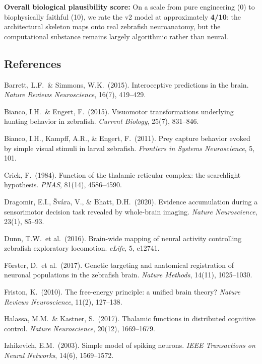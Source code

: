\documentclass[11pt,a4paper]{article}
\begin{document}
\bigskip
\noindent\textbf{Overall biological plausibility score:}
On a scale from pure engineering (0) to biophysically faithful (10),
we rate the v2 model at approximately \textbf{4/10}: the architectural
skeleton maps onto real zebrafish neuroanatomy, but the computational
substance remains largely algorithmic rather than neural.

\subsection*{References}

\begin{small}
\noindent
Barrett, L.F.\ \& Simmons, W.K.\ (2015). Interoceptive predictions in the brain.
\textit{Nature Reviews Neuroscience}, 16(7), 419--429.

\noindent
Bianco, I.H.\ \& Engert, F.\ (2015). Visuomotor transformations underlying hunting behavior in zebrafish.
\textit{Current Biology}, 25(7), 831--846.

\noindent
Bianco, I.H., Kampff, A.R., \& Engert, F.\ (2011). Prey capture behavior evoked by simple visual stimuli in larval zebrafish.
\textit{Frontiers in Systems Neuroscience}, 5, 101.

\noindent
Crick, F.\ (1984). Function of the thalamic reticular complex: the searchlight hypothesis.
\textit{PNAS}, 81(14), 4586--4590.

\noindent
Dragomir, E.I., \v{S}v\'ara, V., \& Bhatt, D.H.\ (2020). Evidence accumulation during a sensorimotor decision task revealed by whole-brain imaging.
\textit{Nature Neuroscience}, 23(1), 85--93.

\noindent
Dunn, T.W.\ et al.\ (2016). Brain-wide mapping of neural activity controlling zebrafish exploratory locomotion.
\textit{eLife}, 5, e12741.

\noindent
F\"orster, D.\ et al.\ (2017). Genetic targeting and anatomical registration of neuronal populations in the zebrafish brain.
\textit{Nature Methods}, 14(11), 1025--1030.

\noindent
Friston, K.\ (2010). The free-energy principle: a unified brain theory?
\textit{Nature Reviews Neuroscience}, 11(2), 127--138.

\noindent
Halassa, M.M.\ \& Kastner, S.\ (2017). Thalamic functions in distributed cognitive control.
\textit{Nature Neuroscience}, 20(12), 1669--1679.

\noindent
Izhikevich, E.M.\ (2003). Simple model of spiking neurons.
\textit{IEEE Transactions on Neural Networks}, 14(6), 1569--1572.


\end{small}
\end{document}
